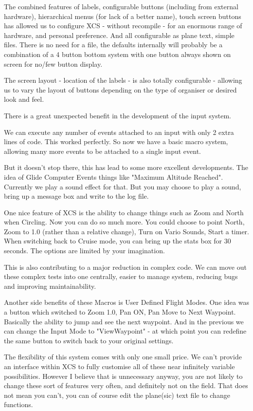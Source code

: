 The combined features of labels, configurable buttons (including from
external hardware), hierarchical menus (for lack of a better name),
touch screen buttons has allowed us to configure XCS - without
recompile - for an enormous range of hardware, and personal
preference.  And all configurable as plane text, simple files. There
is no need for a file, the defaults internally will probably be a
combination of a 4 button bottom system with one button always shown
on screen for no/few button display.

The screen layout - location of the labels - is also totally
configurable - allowing us to vary the layout of buttons depending on
the type of organiser or desired look and feel.

There is a great unexpected benefit in the development of the input
system.

We can execute any number of events attached to an input with only 2
extra lines of code. This worked perfectly. So now we have a basic
macro system, allowing many more events to be attached to a single
input event.

But it doesn't stop there, this has lead to some more excellent
developments. The idea of Glide Computer Events things like "Maximum
Altitude Reached". Currently we play a sound effect for that. But you
may choose to play a sound, bring up a message box and write to the
log file.

One nice feature of XCS is the ability to change things such as Zoom
and North when Circling. Now you can do so much more. You could choose
to point North, Zoom to 1.0 (rather than a relative change), Turn on
Vario Sounds, Start a timer. When switching back to Cruise mode, you
can bring up the stats box for 30 seconds. The options are limited by
your imagination.

This is also contributing to a major reduction in complex code. We can
move out these complex tests into one centrally, easier to manage
system, reducing bugs and improving maintainability.

Another side benefits of these Macros is User Defined Flight
Modes. One idea was a button which switched to Zoom 1.0, Pan ON, Pan
Move to Next Waypoint. Basically the ability to jump and see the next
waypoint. And in the previous we can change the Input Mode to
"ViewWaypoint" - at which point you can redefine the same button to
switch back to your original settings.

The flexibility of this system comes with only one small price. We
can't provide an interface within XCS to fully customise all of these
near infinitely variable possibilities. However I believe that is
unnecessary anyway, you are not likely to change these sort of
features very often, and definitely not on the field. That does not
mean you can't, you can of course edit the plane(sic) text file to
change functions.

